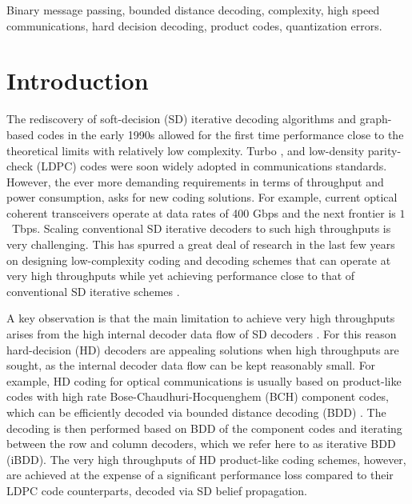 \documentclass[journal]{IEEEtran}
\newcommand{\GL}{\textcolor{black}}
\begin{document}
\begin{IEEEkeywords}
	Binary message passing, bounded distance decoding, complexity, high speed communications, hard decision decoding, product codes, quantization errors.
\end{IEEEkeywords}


\section{Introduction}


The rediscovery of soft-decision (SD) iterative decoding algorithms and graph-based codes in the early 1990s allowed for the first time performance close to the theoretical limits with relatively low complexity. Turbo \GL{\cite{Berrouetal93}}, and low-density parity-check (LDPC) \GL{\cite{Gallager63:LDPC}} codes were soon widely adopted in communications standards. %
However, the ever more demanding requirements in terms  of  throughput and  power consumption, asks for new coding solutions.
For example, current optical coherent transceivers operate at data rates of 400 Gbps and the next frontier  is $1$~Tbps. Scaling conventional SD iterative decoders to such high throughputs  is very challenging.  This has spurred a great deal of research in the last few years on designing low-complexity coding and decoding schemes that can operate at very high throughputs while yet achieving performance close to that of conventional SD iterative schemes \cite{Cushon2016,Ste19}. 

A key observation is that the main limitation to achieve very high throughputs arises from the high internal decoder data flow of SD decoders \cite{staircase_frank}. For this reason hard-decision (HD) decoders are appealing solutions when  high throughputs are sought, as the internal decoder data flow can be kept reasonably small. For example, HD coding for optical communications is usually
based on product-like codes with high rate  Bose-Chaudhuri-Hocquenghem (BCH) component codes, which can be efficiently decoded via bounded distance
decoding (BDD) \cite{staircase_frank,JianPfister2017}. The decoding is then performed based on BDD of the component
codes and iterating between the row and column decoders, which we refer here to as iterative BDD (iBDD). The very high throughputs of HD product-like coding schemes, however, are achieved at the expense of a significant performance loss compared to their LDPC code counterparts, decoded via SD belief propagation. 
\end{document}
